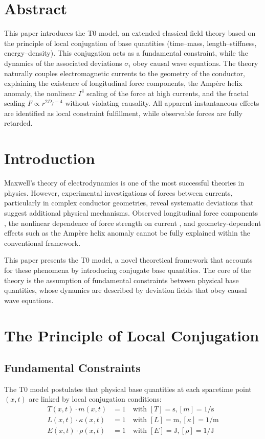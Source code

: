 \section*{Abstract}
		This paper introduces the T0 model, an extended classical field theory based on the principle of local conjugation of base quantities (time--mass, length--stiffness, energy--density). This conjugation acts as a fundamental constraint, while the dynamics of the associated deviations $\sigma_i$ obey causal wave equations. The theory naturally couples electromagnetic currents to the geometry of the conductor, explaining the existence of longitudinal force components, the Ampère helix anomaly, the nonlinear $I^4$ scaling of the force at high currents, and the fractal scaling $F \propto r^{2D_f - 4}$ without violating causality. All apparent instantaneous effects are identified as local constraint fulfillment, while observable forces are fully retarded.

	
	\section{Introduction}
	Maxwell's theory of electrodynamics is one of the most successful theories in physics. However, experimental investigations of forces between currents, particularly in complex conductor geometries, reveal systematic deviations that suggest additional physical mechanisms. Observed longitudinal force components \cite{graneau1985}, the nonlinear dependence of force strength on current \cite{graneau2001}, and geometry-dependent effects such as the Ampère helix anomaly \cite{moore1988} cannot be fully explained within the conventional framework.
	
	This paper presents the T0 model, a novel theoretical framework that accounts for these phenomena by introducing conjugate base quantities. The core of the theory is the assumption of fundamental constraints between physical base quantities, whose dynamics are described by deviation fields that obey causal wave equations.
	
	\section{The Principle of Local Conjugation}
	\subsection{Fundamental Constraints}
	The T0 model postulates that physical base quantities at each spacetime point $(x,t)$ are linked by local conjugation conditions:
	\begin{align}
		T(x,t) \cdot m(x,t) &= 1 \quad \text{with } [T] = \text{s}, [m] = 1/\text{s} \label{eq:conj1} \\
		L(x,t) \cdot \kappa(x,t) &= 1 \quad \text{with } [L] = \text{m}, [\kappa] = 1/\text{m} \label{eq:conj2} \\
		E(x,t) \cdot \rho(x,t) &= 1 \quad \text{with } [E] = \text{J}, [\rho] = 1/\text{J} \label{eq:conj3}
	\end{align}
	
